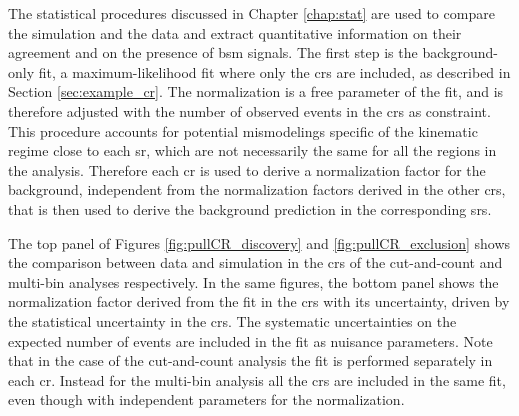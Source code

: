 The statistical procedures discussed in Chapter \ref{chap:stat} are used to compare the simulation and the data and extract 
quantitative information on their agreement and on the presence of \gls{bsm} signals. 
The first step is the background-only fit, a maximum-likelihood fit where only the \glspl{cr} are included, as described in Section 
\ref{sec:example_cr}. 
The \ttbar normalization is a free parameter of the fit, and is therefore adjusted with the number of observed events in the \glspl{cr} 
as constraint.
This procedure accounts for potential mismodelings specific of the kinematic regime close to each \gls{sr}, which are not necessarily 
the same for all the regions in the analysis. Therefore each \gls{cr} is used to derive a normalization factor for the \ttbar background,
independent from the normalization factors derived in the other \glspl{cr}, that is then used to derive the background prediction in the 
corresponding \glspl{sr}. 

The top panel of Figures \ref{fig:pullCR_discovery} and \ref{fig:pullCR_exclusion} shows the 
comparison between data and simulation in the 
\glspl{cr} of the cut-and-count and multi-bin analyses respectively. In the same figures, the bottom panel 
shows the \ttbar normalization factor derived from the fit in the \glspl{cr} with its uncertainty, driven by the statistical uncertainty 
in the \glspl{cr}.  The systematic uncertainties on the expected number of events are included in the fit as nuisance parameters.
Note that in the case of the cut-and-count analysis the fit is performed separately in each \gls{cr}.
Instead for the multi-bin analysis all the \glspl{cr} are included in the same fit, even though with independent parameters for the 
\ttbar normalization. 
 

